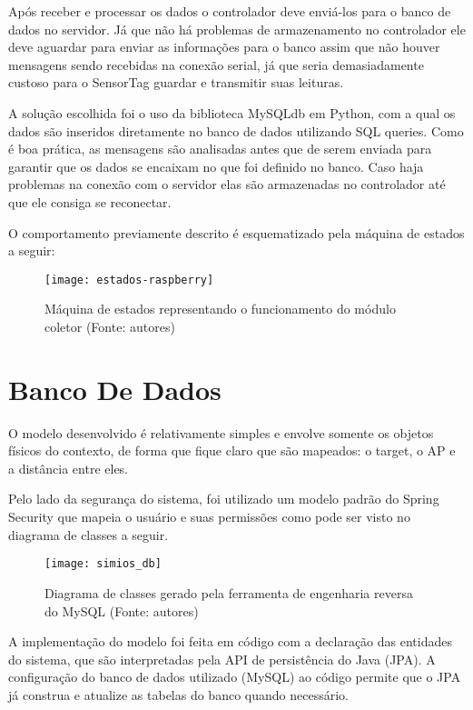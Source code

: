 Após receber e processar os dados o controlador deve enviá-los para o banco de dados no servidor. Já que não há problemas de armazenamento no controlador ele deve aguardar para enviar as informações para o banco assim que não houver mensagens sendo recebidas na conexão serial, já que seria demasiadamente custoso para o SensorTag guardar e transmitir suas leituras.

A solução escolhida foi o uso da biblioteca MySQLdb em Python, com a qual os dados são inseridos diretamente no banco de dados utilizando SQL queries. Como é boa prática, as mensagens são analisadas antes que de serem enviada para garantir que os dados se encaixam no que foi definido no banco. Caso haja problemas na conexão com o servidor elas são armazenadas no controlador até que ele consiga se reconectar.

O comportamento previamente descrito é esquematizado pela máquina de estados a seguir:

\begin{figure}[ht]
  \centering
    \texttt{[image: estados-raspberry]}
  \caption{Máquina de estados representando o funcionamento do módulo coletor (Fonte: autores)}
\end{figure}
\FloatBarrier

\section{Banco De Dados}

O modelo desenvolvido é relativamente simples e envolve somente os objetos físicos do contexto, de forma que fique claro que são mapeados: o target, o AP e a distância entre eles.

Pelo lado da segurança do sistema, foi utilizado um modelo padrão do Spring Security que mapeia o usuário e suas permissões como pode ser visto no diagrama de classes a seguir.

\begin{figure}[ht]
  \centering
    \texttt{[image: simios\_db]}
  \caption{Diagrama de classes gerado pela ferramenta de engenharia reversa do MySQL (Fonte: autores)}
\end{figure}
\FloatBarrier

A implementação do modelo foi feita em código com a declaração das entidades do sistema, que são interpretadas pela API de persistência do Java (JPA). A configuração do banco de dados utilizado (MySQL) ao código permite que o JPA já construa e atualize as tabelas do banco quando necessário.

